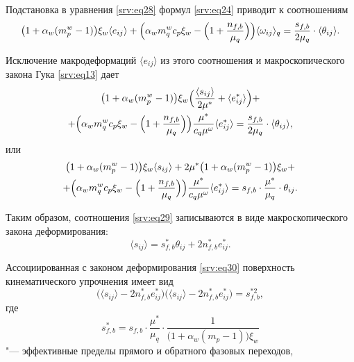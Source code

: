 Подстановка в уравнения \eqref{srv:eq28} формул \eqref{srv:eq24} приводит к соотношениям
\begin{multline}
\bigl(1+\alpha_{w} (m_{p}^{w}-1 )\bigr) \xi_{w}  
\langle  {e_{ij}}  \rangle 
+ 
\Bigl(\alpha_{w} m_{q}^{w} c_{p} \xi_{w} -
\Bigl(1+\dfrac{n_{f,b}}{\mu_{q}}\Bigr)\Bigr) \langle  {\omega_{ij}}  \rangle _{q}=\dfrac{s_{f,b}}{2\mu_{q}}\cdot \langle  {\theta_{ij}} \rangle .
\end{multline}

Исключение макродеформаций $ \langle  {e_{ij}}  \rangle $  из  этого соотношения и макроскопического закона Гука \eqref{srv:eq13} дает
\begin{multline}
\bigl(1+\alpha_{w}  (m_{p}^{w}-1 )\bigr) \xi_{w} 
\Bigl(\dfrac{ \langle  {s_{ij}}  \rangle }{2\mu^{*}}+ \langle  {e^{*}_{ij}}  \rangle \Bigr)+\\
+
\Bigl(\alpha_{w} m_{q}^{w} c_{p} \xi_{w} -\Bigl(1+\dfrac{n_{f,b}}{\mu_{q}}\Bigr)\Bigr)
\dfrac{\mu^{*}}{c_{q} \mu^{\omega}} \langle  {e^{*}_{ij}}  \rangle =\dfrac{s_{f,b}}{2\mu_{q}}\cdot \langle  {\theta_{ij}} \rangle ,
\end{multline}
или
\begin{multline}\label{srv:eq29}
\bigl(1+\alpha_{w}  (m_{p}^{w}-1 )\bigr) \xi_{w}  \langle  {s_{ij}}  \rangle 
+2\mu^{*} \bigl(1+\alpha_{w} (m_{p}^{w}-1)\bigr) \xi_{w}+\\ 
+\Bigl(\alpha_{w} m_{q}^{w} c_{p} \xi_{w} -
\Bigl(1+\dfrac{n_{f,b}}{\mu_{q}}\Bigr)
\Bigr)\dfrac{\mu^{*}}{c_{q} \mu^{\omega}} \langle  {e^{*}_{ij}}  \rangle =s_{f,b}\cdot\dfrac{\mu^{*}}{\mu_{q}}\cdot\theta_{ij}.
\end{multline}

Таким образом, соотношения \eqref{srv:eq29} записываются в виде макроскопического закона деформирования:
\begin{equation}\label{srv:eq30}
 \langle  {s_{ij}}  \rangle =s_{f,b}^{*} \theta_{ij}+2 n_{f,b}^{*} {e^{*}_{ij}} .
\end{equation}

Ассоциированная с законом деформирования \eqref{srv:eq30} поверхность кинематического упрочнения имеет вид
\begin{equation}\label{srv:eq31}
\bigl( \langle  {s_{ij}}  \rangle -2 n_{f,b}^{*}  e^{*}_{ij}\bigr)\bigl( \langle  {s_{ij}}  \rangle -2 n_{f,b}^{*}  e^{*}_{ij}\bigr)=s_{f,b}^{*2},
\end{equation}
где
\begin{equation}\label{srv:eq32}
s_{f,b}^{*}=s_{f,b}\cdot\dfrac{\mu^{*}}{\mu_{q}}\cdot\dfrac{1}{\bigl(1+\alpha_{w} (m_{p}-1 )\bigr) \xi_{w}}
\end{equation}
"--- эффективные пределы прямого и обратного фазовых переходов,


